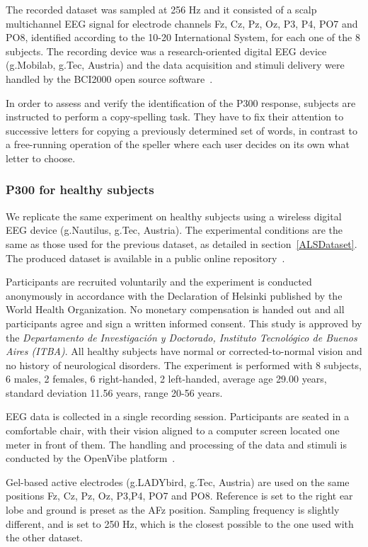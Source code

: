 \documentclass[utf8]{frontiersSCNS} %
\begin{document}
The recorded dataset was sampled at 256 Hz and it consisted of a scalp multichannel EEG signal for electrode channels Fz, Cz, Pz, Oz, P3, P4, PO7 and PO8, identified according to the 10-20 International System,  for each one of the 8 subjects.   The recording device was a research-oriented digital EEG device (g.Mobilab, g.Tec, Austria) and the data acquisition and stimuli delivery were handled by the BCI2000 open source software~\citep{Schalk2004}.

In order to assess and verify the identification of the P300 response, subjects are instructed to perform a copy-spelling task. They have to fix their attention to successive letters for copying a previously determined set of words, in contrast to a free-running operation of the speller where each user decides on its own what letter to choose.

\subsubsection{P300 for healthy subjects}

We replicate the same experiment on healthy subjects using a wireless digital EEG device (g.Nautilus, g.Tec, Austria).  The experimental conditions are the same as those used for the previous dataset, as detailed in section~\ref{ALSDataset}.  The produced dataset is available in a public online repository~\citep{owndataset}.

Participants are recruited voluntarily and the experiment is conducted anonymously in accordance with the Declaration of Helsinki published by the World Health Organization.  No monetary compensation is handed out and all participants agree and sign a written informed consent.  This study is approved by the \textit{Departamento de Investigación y Doctorado, Instituto Tecnológico de Buenos Aires (ITBA)}.  All healthy subjects have normal or corrected-to-normal vision and no history of neurological disorders. The experiment is performed with 8 subjects, 6 males, 2 females, 6 right-handed, 2 left-handed, average age 29.00 years, standard deviation  11.56 years, range 20-56 years.

EEG data is collected in a single recording session. Participants are seated in a comfortable chair, with their vision aligned to a computer screen located one meter in front of them.  The handling and processing of the data and stimuli is conducted by the OpenVibe platform~\citep{Renard2010}. 

Gel-based active electrodes (g.LADYbird, g.Tec, Austria) are used on the same positions Fz, Cz, Pz, Oz, P3,P4, PO7 and PO8.  Reference is set to the right ear lobe and ground is preset as the AFz position.   Sampling frequency is slightly different, and is set to 250 Hz, which is the closest possible to the one used with the other dataset.
\end{document}
